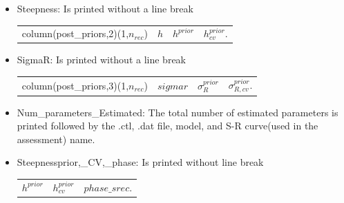 \documentclass{article}
\begin{document}
\begin{itemize}
\begin{center}
\begin{tabular}{c c c c}
        \end{tabular}
    \end{center}
    \item Steepness: Is printed without a line break
    \begin{center}
        \begin{tabular}{c c c c}
            column(post\_priors,2)(1,$n_{rec}$) &  $h$ & $h^{prior}$ &  $h^{prior}_{cv}$.\\
        \end{tabular}
    \end{center}
    \item SigmaR:  Is printed without a line break
    \begin{center}
        \begin{tabular}{c c c c}
           column(post\_priors,3)(1,$n_{rec}$)  &  $sigmar$ &  $\sigma_{R}^{prior}$ & $\sigma_{R,cv}^{prior}$.\\
        \end{tabular}
    \end{center}
    \item Num\_parameters\_Estimated: The total number of estimated parameters is printed followed by the .ctl, .dat file, model, and S-R curve(used in the assessment) name.
    \item Steepnessprior,\_CV,\_phase: Is printed without line break 
    \begin{center}
        \begin{tabular}{c c c}
          $h^{prior}$    &   $h^{prior}_{cv}$ & $phase\_srec$.\\
        \end{tabular}
    \end{center}


\end{itemize}
\end{document}
